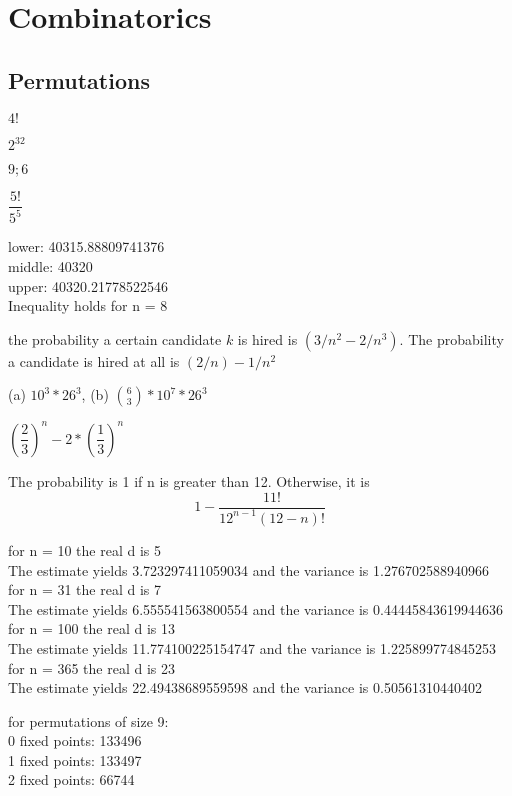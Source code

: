 \chapter{Combinatorics}
\section{Permutations}

	\begin{oddenumerate}
		\item $ 4! $
		\item $ 2^{32} $
		\item $ 9; 6 $
		\item $ \dfrac{5!}{5^5} $
		\item lower: 40315.88809741376
		\\ middle: 40320
		\\ upper: 40320.21778522546
		\\ Inequality holds for n = 8
		\item the probability a certain candidate $ k $ is hired is $ (3/n^2 - 2/n^3) $. The probability a candidate is hired at all is $ (2/n) - 1/n^2 $
		\item (a) $ 10^3 * 26^3 $, (b) $  \binom{6}{3} * 10^7 * 26^3$
		\item $  (\dfrac{2}{3})^n - 2*(\dfrac{1}{3})^n  $
		\item The probability is 1 if n is greater than 12. Otherwise, it is \[ 1 - \dfrac{11!}{12^{n-1}(12-n)!} \]
		\item for n =  10 the real d is  5
		\\ The estimate yields  3.723297411059034  and the variance is  1.276702588940966
		\\ for n =  31 the real d is  7
		\\ The estimate yields  6.555541563800554  and the variance is  0.44445843619944636
		\\ for n =  100 the real d is  13
		\\ The estimate yields  11.774100225154747  and the variance is  1.225899774845253
		\\ for n =  365 the real d is  23
		\\ The estimate yields  22.49438689559598  and the variance is  0.50561310440402
		\item for permutations of size 9:
		\\ 0 fixed points: 133496
		\\ 1 fixed points: 133497
		\\ 2 fixed points: 66744

\end{oddenumerate}
